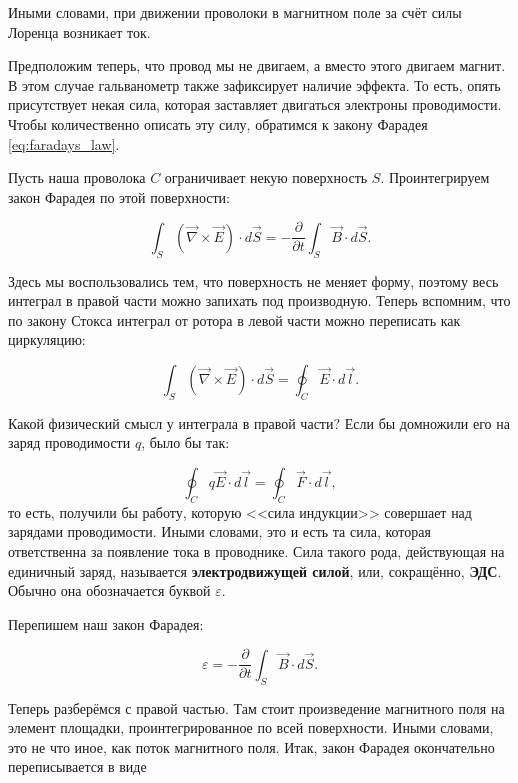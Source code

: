 \documentclass[a4paper,12pt]{article}
\newcommand{\pt}{\partial}
\newcommand{\vareps}{\varepsilon}
\newcommand{\vn}{\vec{\nabla}}
\begin{document}
Иными словами, при движении проволоки в магнитном поле за счёт силы
Лоренца возникает ток. 

Предположим теперь, что провод мы не двигаем, а вместо этого двигаем
магнит. В этом случае гальванометр также зафиксирует наличие
эффекта. То есть, опять присутствует некая сила, которая заставляет
двигаться электроны проводимости. Чтобы количественно описать эту
силу, обратимся к закону Фарадея \eqref{eq:faradays_law}. 

Пусть наша проволока $C$ ограничивает некую поверхность
$S$. Проинтегрируем закон Фарадея по этой поверхности: 

\begin{equation}
  \label{eq:eds_1}
  \int_S \left( \vn \times \vec{E} \right) \cdot d\vec{S} = -
  \frac{\pt}{\pt t} \int_S \vec{B} \cdot d\vec{S}.
\end{equation}

Здесь мы воспользовались тем, что поверхность не меняет форму, поэтому
весь интеграл в правой части можно запихать под производную. Теперь
вспомним, что по закону Стокса интеграл от ротора в левой части можно
переписать как циркуляцию: 

\begin{equation}
  \label{eq:eds_2}
  \int_S \left( \vn \times \vec{E} \right) \cdot d\vec{S} = \oint_C
  \vec{E} \cdot d \vec{l}.
\end{equation}

Какой физический смысл у интеграла в правой части? Если бы домножили
его на заряд проводимости $q$, было бы так: 

\begin{equation}
  \label{eq:eds_3}
  \oint_C q \vec{E} \cdot d \vec{l} = \oint_C \vec{F} \cdot d \vec{l},
\end{equation}
то есть, получили бы работу, которую <<сила индукции>> совершает над
зарядами проводимости. Иными словами, это и есть та сила, которая
ответственна за появление тока в проводнике. Сила такого рода,
действующая на единичный заряд, называется \textbf{электродвижущей
  силой}, или, сокращённо, \textbf{ЭДС}. Обычно она обозначается
буквой $\vareps$. 

Перепишем наш закон Фарадея:

\begin{equation}
  \label{eq:eds_4}
  \vareps = - \frac{\pt}{\pt t} \int_S \vec{B} \cdot d\vec{S}.
\end{equation}

Теперь разберёмся с правой частью. Там стоит произведение магнитного
поля на элемент площадки, проинтегрированное по всей
поверхности. Иными словами, это не что иное, как поток магнитного
поля. Итак, закон Фарадея окончательно переписывается в виде
\end{document}
